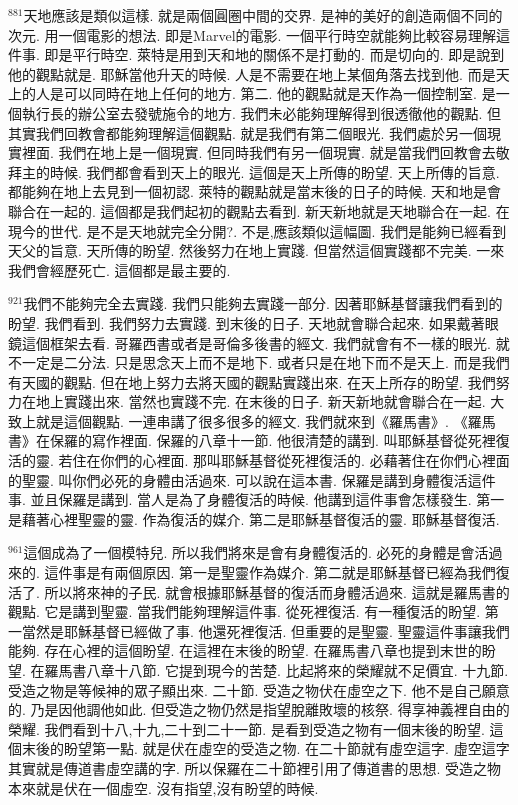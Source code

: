 \documentclass{book}
\begin{document}
$^{881}$天地應該是類似這樣.
就是兩個圓圈中間的交界.
是神的美好的創造兩個不同的次元.
用一個電影的想法.
即是Marvel的電影.
一個平行時空就能夠比較容易理解這件事.
即是平行時空.
萊特是用到天和地的關係不是打動的.
而是切向的.
即是說到他的觀點就是.
耶穌當他升天的時候.
人是不需要在地上某個角落去找到他.
而是天上的人是可以同時在地上任何的地方.
第二.
他的觀點就是天作為一個控制室.
是一個執行長的辦公室去發號施令的地方.
我們未必能夠理解得到很透徹他的觀點.
但其實我們回教會都能夠理解這個觀點.
就是我們有第二個眼光.
我們處於另一個現實裡面.
我們在地上是一個現實.
但同時我們有另一個現實.
就是當我們回教會去敬拜主的時候.
我們都會看到天上的眼光.
這個是天上所傳的盼望.
天上所傳的旨意.
都能夠在地上去見到一個初認.
萊特的觀點就是當末後的日子的時候.
天和地是會聯合在一起的.
這個都是我們起初的觀點去看到.
新天新地就是天地聯合在一起.
在現今的世代.
是不是天地就完全分開?.
不是,應該類似這幅圖.
我們是能夠已經看到天父的旨意.
天所傳的盼望.
然後努力在地上實踐.
但當然這個實踐都不完美.
一來我們會經歷死亡.
這個都是最主要的.

$^{921}$我們不能夠完全去實踐.
我們只能夠去實踐一部分.
因著耶穌基督讓我們看到的盼望.
我們看到.
我們努力去實踐.
到末後的日子.
天地就會聯合起來.
如果戴著眼鏡這個框架去看.
哥羅西書或者是哥倫多後書的經文.
我們就會有不一樣的眼光.
就不一定是二分法.
只是思念天上而不是地下.
或者只是在地下而不是天上.
而是我們有天國的觀點.
但在地上努力去將天國的觀點實踐出來.
在天上所存的盼望.
我們努力在地上實踐出來.
當然也實踐不完.
在末後的日子.
新天新地就會聯合在一起.
大致上就是這個觀點.
一連串講了很多很多的經文.
我們就來到《羅馬書》.
《羅馬書》在保羅的寫作裡面.
保羅的八章十一節.
他很清楚的講到.
叫耶穌基督從死裡復活的靈.
若住在你們的心裡面.
那叫耶穌基督從死裡復活的.
必藉著住在你們心裡面的聖靈.
叫你們必死的身體由活過來.
可以說在這本書.
保羅是講到身體復活這件事.
並且保羅是講到.
當人是為了身體復活的時候.
他講到這件事會怎樣發生.
第一是藉著心裡聖靈的靈.
作為復活的媒介.
第二是耶穌基督復活的靈.
耶穌基督復活.

$^{961}$這個成為了一個模特兒.
所以我們將來是會有身體復活的.
必死的身體是會活過來的.
這件事是有兩個原因.
第一是聖靈作為媒介.
第二就是耶穌基督已經為我們復活了.
所以將來神的子民.
就會根據耶穌基督的復活而身體活過來.
這就是羅馬書的觀點.
它是講到聖靈.
當我們能夠理解這件事.
從死裡復活.
有一種復活的盼望.
第一當然是耶穌基督已經做了事.
他還死裡復活.
但重要的是聖靈.
聖靈這件事讓我們能夠.
存在心裡的這個盼望.
在這裡在末後的盼望.
在羅馬書八章也提到末世的盼望.
在羅馬書八章十八節.
它提到現今的苦楚.
比起將來的榮耀就不足價宜.
十九節.
受造之物是等候神的眾子顯出來.
二十節.
受造之物伏在虛空之下.
他不是自己願意的.
乃是因他調他如此.
但受造之物仍然是指望脫離敗壞的核祭.
得享神義裡自由的榮耀.
我們看到十八,十九,二十到二十一節.
是看到受造之物有一個末後的盼望.
這個末後的盼望第一點.
就是伏在虛空的受造之物.
在二十節就有虛空這字.
虛空這字其實就是傳道書虛空講的字.
所以保羅在二十節裡引用了傳道書的思想.
受造之物本來就是伏在一個虛空.
沒有指望,沒有盼望的時候.
\end{document}
